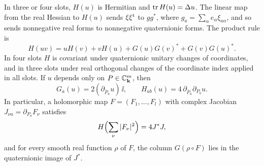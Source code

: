 \begin{lemma}\label{lem:hessian}
In three or four slots, $H(u)$ is Hermitian and $\operatorname{tr} H(u)=\Delta u$. The linear map from the
real Hessian to $H(u)$ sends $\xi\xi^{\rm t}$ to $gg^*$, where $g_a=\sum_\alpha e_\alpha\xi_{a\alpha}$,
and so sends nonnegative real forms to nonnegative quaternionic forms. The product rule is
\begin{equation}\label{eq:product}
H(uv)=uH(v)+vH(u)+G(u)G(v)^*+G(v)G(u)^* .
\end{equation}
In four slots $H$ is covariant under quaternionic unitary changes of coordinates, and in
three slots under real orthogonal changes of the coordinate index applied in all slots. If
$u$ depends only on $P\in\mathbb{C}_{\mathbf k}^m$, then
\begin{equation}\label{eq:holHess}
G_a(u)=2(\partial_{\bar P_a}u)\,\ii,\qquad H_{ab}(u)=4\,\partial_{\bar P_a}\partial_{P_b}u .
\end{equation}
In particular, a holomorphic map $F=(F_1,\dots,F_l)$ with complex Jacobian
$J_{\nu a}=\partial_{P_a}F_\nu$ satisfies
\begin{equation}\label{eq:holsq}
H\Bigl(\sum_\nu|F_\nu|^2\Bigr)=4J^*J ,
\end{equation}
and for every smooth real function $\rho$ of $F$, the column $G(\rho\circ F)$ lies in the
quaternionic image of $J^*$.
\end{lemma}

